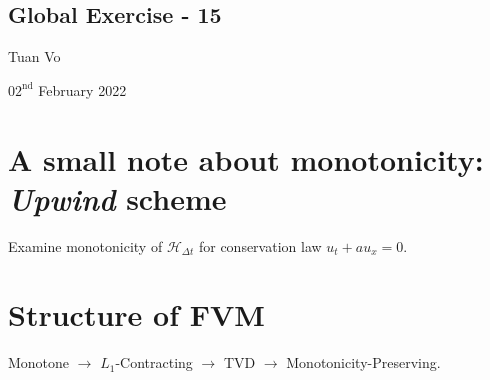 \documentclass[12pt]{article}
\begin{document}
\begin{center}
	\section*{Global Exercise - 15}
\end{center}
\begin{center}
	Tuan Vo
\end{center}
\begin{center}
	$02^{\text{nd}}$ February 2022
\end{center}


\section{A small note about monotonicity: \emph{Upwind} scheme}
\begin{example}
	Examine monotonicity of $\mathcal{H}_{\Delta t}$ for conservation law $u_{t} + au_x = 0$.
\end{example}



\clearpage
\section{Structure of FVM}
\begin{example}
	Monotone $\rightarrow$ $L_1$-Contracting $\rightarrow$ TVD $\rightarrow$ Monotonicity-Preserving.
\end{example}
\end{document}
